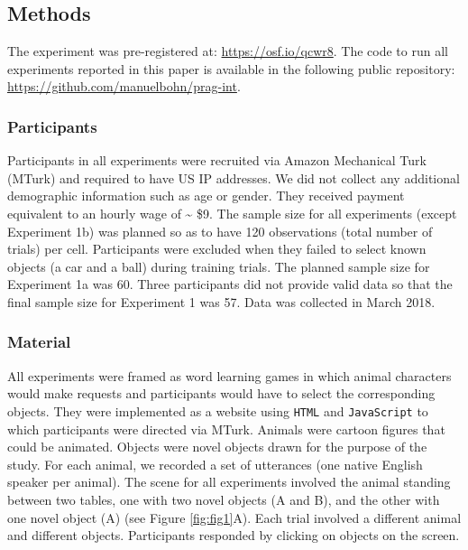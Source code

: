 \documentclass[
  man,floatsintext]{apa6}
\begin{document}
\subsection{Methods}\label{methods}

The experiment was pre-registered at: \url{https://osf.io/qcwr8}. The code to run all experiments reported in this paper is available in the following public repository: \url{https://github.com/manuelbohn/prag-int}.

\subsubsection{Participants}\label{participants}

Participants in all experiments were recruited via Amazon Mechanical Turk (MTurk) and required to have US IP addresses. We did not collect any additional demographic information such as age or gender. They received payment equivalent to an hourly wage of \textasciitilde{} \$9. The sample size for all experiments (except Experiment 1b) was planned so as to have 120 observations (total number of trials) per cell. Participants were excluded when they failed to select known objects (a car and a ball) during training trials. The planned sample size for Experiment 1a was 60. Three participants did not provide valid data so that the final sample size for Experiment 1 was 57. Data was collected in March 2018.

\subsubsection{Material}\label{material}

All experiments were framed as word learning games in which animal characters would make requests and participants would have to select the corresponding objects. They were implemented as a website using \texttt{HTML} and \texttt{JavaScript} to which participants were directed via MTurk. Animals were cartoon figures that could be animated. Objects were novel objects drawn for the purpose of the study. For each animal, we recorded a set of utterances (one native English speaker per animal). The scene for all experiments involved the animal standing between two tables, one with two novel objects (A and B), and the other with one novel object (A) (see Figure \ref{fig:fig1}A). Each trial involved a different animal and different objects. Participants responded by clicking on objects on the screen.
\end{document}
